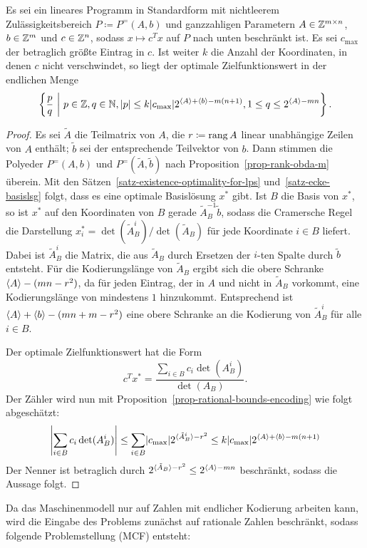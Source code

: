 \begin{lemma}\label{lemma-optimal-value-in-finite-domain}
	Es sei ein lineares Programm in Standardform mit nichtleerem Zu\-lässig\-keits\-bereich $P\coloneq P^=(A,b)$ und ganzzahligen Parametern $A\in \mathbb{Z}^{m\times n}$, $b\in\mathbb{Z}^m$ und $c\in\mathbb{Z}^n$, sodass $x\mapsto c^T x$ auf $P$ nach unten beschränkt ist.
	Es sei $c_{\max}$ der betraglich größte Eintrag in $c$.
	Ist weiter $k$ die Anzahl der Koordinaten, in denen $c$ nicht verschwindet, so liegt der optimale Zielfunktionswert in der endlichen Menge
	\[
	\left\{ \frac{p}{q} ~\middle|~ p\in\mathbb{Z}, q\in\mathbb{N}, \lvert p\rvert \leq k \lvert c_{\max}\rvert 2^{\langle A\rangle + \langle b\rangle -m(n + 1)}, 1\leq q \leq 2^{\langle A\rangle-mn} \right\}.
	\]
\end{lemma}
\begin{proof}
	Es sei $\tilde{A}$ die Teilmatrix von $A$, die $r\coloneq \operatorname{rang}{A}$ linear unabhängige Zeilen von $A$ enthält; $\tilde{b}$ sei der entsprechende Teilvektor von $b$.
	Dann stimmen die Polyeder $P^=(A,b)$ und $P^=(\tilde{A}, \tilde{b})$ nach Proposition~\ref{prop-rank-obda-m} überein.
	Mit den Sätzen~\ref{satz-existence-optimality-for-lps} und~\ref{satz-ecke-basislsg} folgt, dass es eine optimale Basislösung $x^*$ gibt.
	Ist $B$ die Basis von $x^*$, so ist $x^*$ auf den Koordinaten von $B$ gerade $\tilde{A}_B^{-1} \tilde{b}$, sodass die Cramersche Regel die Darstellung $x_i^* = \det(\tilde{A}_B^i) / \det(\tilde{A}_B)$ für jede Koordinate $i\in B$ liefert.
	Dabei ist $\tilde{A}_B^i$ die Matrix, die aus $\tilde{A}_B$ durch Ersetzen der $i$-ten Spalte durch $\tilde{b}$ entsteht.
	Für die Kodierungslänge von $\tilde{A}_B$ ergibt sich die obere Schranke $\langle A\rangle - (mn - r^2)$, da für jeden Eintrag, der in $A$ und nicht in $\tilde{A}_B$ vorkommt, eine Kodierungslänge von mindestens $1$ hinzukommt.
	Entsprechend ist $\langle A\rangle + \langle b\rangle - (mn + m - r^2)$ eine obere Schranke an die Kodierung von $\tilde{A}_B^i$ für alle $i\in B$.
	
	Der optimale Zielfunktionswert hat die Form \[
	c^T x^* = 
	\frac{\sum_{i\in B} c_i \det(A_B^i)}{\det(A_B)}.
	\]
	Der Zähler wird nun mit Proposition~\ref{prop-rational-bounds-encoding} wie folgt abgeschätzt:
	\[
	\left| { \sum_{i\in B} c_i \det(A_B^i) } \right| \leq \sum_{i\in B} \lvert c_{\max}\rvert 2^{\langle\tilde{A}_B^i\rangle- r^2} \leq k \lvert c_{\max}\rvert 2^{\langle A\rangle + \langle b\rangle - m(n+1)}
	\]
	Der Nenner ist betraglich durch $2^{\langle\tilde{A}_B\rangle - r^2}\leq 2^{\langle A\rangle - mn}$ beschränkt, sodass die Aussage folgt.
\end{proof}

Da das Maschinenmodell nur auf Zahlen mit endlicher Kodierung arbeiten kann, wird die Eingabe des Problems zunächst auf rationale Zahlen beschränkt, sodass folgende Problemstellung (MCF) entsteht:

